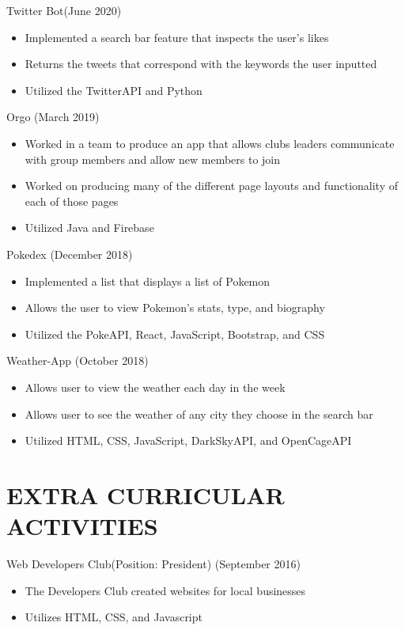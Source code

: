 \documentclass[margin]{res}
\begin{document}
\begin{resume}
\begin{itemize}
 		\end{itemize}
 		
 	Twitter Bot(June 2020)
 		\begin{itemize} \itemsep -2pt 
 		\item Implemented a search bar feature that inspects the user's likes
 		\item Returns the tweets that correspond with the keywords the user inputted 
 		\item Utilized the TwitterAPI and Python
 		
 		\end{itemize}
 
    Orgo (March 2019)
 		\begin{itemize} \itemsep -1pt 
 		\item Worked in a team to produce an app that allows clubs leaders communicate with group members and allow new members to join 
 		\item Worked on producing many of the different page layouts and functionality of each of those pages
 		\item Utilized Java and Firebase
 		
 		\end{itemize}
 		
	Pokedex (December 2018)
 		\begin{itemize} \itemsep -2pt 
 		\item Implemented a list that displays a list of Pokemon 
 		\item Allows the user to view Pokemon's stats, type, and biography
 		\item Utilized the PokeAPI, React, JavaScript, Bootstrap, and CSS
 		
 		\end{itemize}    
 		
 	Weather-App (October 2018)
 		\begin{itemize} \itemsep -2pt 
 		\item Allows user to view the weather each day in the week
 		\item Allows user to see the weather of any city they choose in the search bar
 		\item Utilized HTML, CSS, JavaScript, DarkSkyAPI, and OpenCageAPI
 		
 		\end{itemize}
 		
 	
 \section{EXTRA CURRICULAR ACTIVITIES} 
 		
 	Web Developers Club(Position: President) (September 2016)
 		\begin{itemize} \itemsep -2pt 
 		\item The Developers Club created websites for local businesses
 		\item Utilizes HTML, CSS, and Javascript
 		
 		\end{itemize}
 		

\end{resume}
\end{document}
